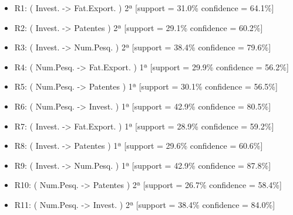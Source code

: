 \documentclass[kdmile,a4paper]{kdmile} %
\begin{document}
\begin{itemize}
    \item R1: ( Invest. -> Fat.Export. ) 2ª [support = 31.0\% confidence = 64.1\%]
    \item R2: ( Invest. -> Patentes ) 2ª [support = 29.1\% confidence = 60.2\%]
    \item R3: ( Invest. -> Num.Pesq. ) 2ª [support = 38.4\% confidence = 79.6\%]
    \item R4: ( Num.Pesq. -> Fat.Export. ) 1ª [support = 29.9\% confidence = 56.2\%]
    \item R5: ( Num.Pesq. -> Patentes ) 1ª [support = 30.1\% confidence = 56.5\%]
    \item R6: ( Num.Pesq. -> Invest. ) 1ª [support = 42.9\% confidence = 80.5\%]
    \item R7: ( Invest. -> Fat.Export. ) 1ª [support = 28.9\% confidence = 59.2\%]
    \item R8: ( Invest. -> Patentes ) 1ª [support = 29.6\% confidence = 60.6\%]
    \item R9: ( Invest. -> Num.Pesq. ) 1ª [support = 42.9\% confidence = 87.8\%]
    \item R10: ( Num.Pesq. -> Patentes ) 2ª [support = 26.7\% confidence = 58.4\%]
    \item R11: ( Num.Pesq. -> Invest. ) 2ª [support = 38.4\% confidence = 84.0\%]

\end{itemize}
\end{document}
